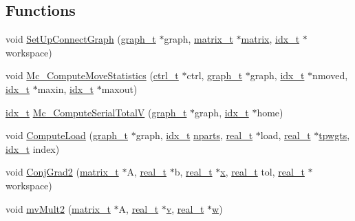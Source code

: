 \subsection*{Functions}
\begin{DoxyCompactItemize}
\item 
void \hyperlink{a00353_ae66862df97d3cf546259e4f679371730}{Set\+Up\+Connect\+Graph} (\hyperlink{a00734}{graph\+\_\+t} $\ast$graph, \hyperlink{a00754}{matrix\+\_\+t} $\ast$\hyperlink{a01014_af07ff1035f34d77764ff516f110e6832}{matrix}, \hyperlink{a00876_aaa5262be3e700770163401acb0150f52}{idx\+\_\+t} $\ast$workspace)
\item 
void \hyperlink{a00353_a007901e980318b5c455c6798c5686fc4}{Mc\+\_\+\+Compute\+Move\+Statistics} (\hyperlink{a00742}{ctrl\+\_\+t} $\ast$ctrl, \hyperlink{a00734}{graph\+\_\+t} $\ast$graph, \hyperlink{a00876_aaa5262be3e700770163401acb0150f52}{idx\+\_\+t} $\ast$nmoved, \hyperlink{a00876_aaa5262be3e700770163401acb0150f52}{idx\+\_\+t} $\ast$maxin, \hyperlink{a00876_aaa5262be3e700770163401acb0150f52}{idx\+\_\+t} $\ast$maxout)
\item 
\hyperlink{a00876_aaa5262be3e700770163401acb0150f52}{idx\+\_\+t} \hyperlink{a00353_ac2a70991745acc003b806be26e3a8124}{Mc\+\_\+\+Compute\+Serial\+TotalV} (\hyperlink{a00734}{graph\+\_\+t} $\ast$graph, \hyperlink{a00876_aaa5262be3e700770163401acb0150f52}{idx\+\_\+t} $\ast$home)
\item 
void \hyperlink{a00353_ae334beb9a86e6a2816584c5d9872ecd7}{Compute\+Load} (\hyperlink{a00734}{graph\+\_\+t} $\ast$graph, \hyperlink{a00876_aaa5262be3e700770163401acb0150f52}{idx\+\_\+t} \hyperlink{a00879_aad88065af88fd6759101788a8e15ce9e}{nparts}, \hyperlink{a00876_a1924a4f6907cc3833213aba1f07fcbe9}{real\+\_\+t} $\ast$load, \hyperlink{a00876_a1924a4f6907cc3833213aba1f07fcbe9}{real\+\_\+t} $\ast$\hyperlink{a00879_aa91786cd8ea996ec49ed5b382eb7fc2f}{tpwgts}, \hyperlink{a00876_aaa5262be3e700770163401acb0150f52}{idx\+\_\+t} index)
\item 
void \hyperlink{a00353_a31c811c3b724d9d26416be8831be44e0}{Conj\+Grad2} (\hyperlink{a00754}{matrix\+\_\+t} $\ast$A, \hyperlink{a00876_a1924a4f6907cc3833213aba1f07fcbe9}{real\+\_\+t} $\ast$b, \hyperlink{a00876_a1924a4f6907cc3833213aba1f07fcbe9}{real\+\_\+t} $\ast$\hyperlink{a00605_ac98c3bb25378222646e977292011625f}{x}, \hyperlink{a00876_a1924a4f6907cc3833213aba1f07fcbe9}{real\+\_\+t} tol, \hyperlink{a00876_a1924a4f6907cc3833213aba1f07fcbe9}{real\+\_\+t} $\ast$workspace)
\item 
void \hyperlink{a00353_a4ac5c2a9274b1ea7377f70e1047659db}{mv\+Mult2} (\hyperlink{a00754}{matrix\+\_\+t} $\ast$A, \hyperlink{a00876_a1924a4f6907cc3833213aba1f07fcbe9}{real\+\_\+t} $\ast$\hyperlink{a00605_ac4055e3a20b6b3af3d10590ea446ef6c}{v}, \hyperlink{a00876_a1924a4f6907cc3833213aba1f07fcbe9}{real\+\_\+t} $\ast$\hyperlink{a00605_aad57484016654da87125db86f4227ea3}{w})

\end{DoxyCompactItemize}
